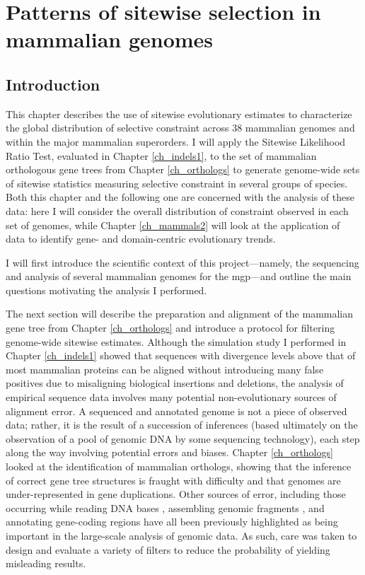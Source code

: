 \chapter{Patterns of sitewise selection in mammalian genomes}
\label{ch_mammals1}
\acresetall

\section{Introduction}

This chapter describes the use of sitewise evolutionary estimates to
characterize the global distribution of selective constraint across 38
mammalian genomes and within the major mammalian superorders. I will
apply the Sitewise Likelihood Ratio Test, evaluated in Chapter
\ref{ch_indels1}, to the set of mammalian orthologous gene trees from
Chapter \ref{ch_orthologs} to generate genome-wide sets of sitewise
statistics measuring selective constraint in several groups of \mammln
species. Both this chapter and the following one are concerned with
the analysis of these data: here I will consider the overall
distribution of constraint observed in each set of genomes, while
Chapter \ref{ch_mammals2} will look at the application of \sw data to
identify gene- and domain-centric evolutionary trends.

I will first introduce the scientific context of this
project---namely, the sequencing and analysis of several mammalian
genomes for the \ac{mgp}---and outline the main questions motivating
the analysis I performed.

The next section will describe the preparation and alignment of the
mammalian gene tree from Chapter \ref{ch_orthologs} and introduce a
protocol for filtering genome-wide sitewise estimates. Although the
simulation study I performed in Chapter \ref{ch_indels1} showed that
sequences with divergence levels above that of most mammalian proteins
can be aligned without introducing many false positives due to
misaligning biological insertions and deletions, the analysis of
empirical sequence data involves many potential non-evolutionary
sources of alignment error. A sequenced and annotated genome is not a
piece of observed data; rather, it is the result of a succession of
inferences (based ultimately on the observation of a pool of genomic
DNA by some sequencing technology), each step along the way involving
potential errors and biases. Chapter \ref{ch_orthologs} looked at the
identification of mammalian orthologs, showing that the inference of
correct gene tree structures is fraught with difficulty and that \lcv
genomes are under-represented in gene duplications. Other sources of
error, including those occurring while reading DNA bases \citep{TODO},
assembling genomic fragments \citep{TODO}, and annotating gene-coding
regions \citep{TODO} have all been previously highlighted as being
important in the large-scale analysis of genomic data. As such, care
was taken to design and evaluate a variety of filters to reduce the
probability of yielding misleading results.

